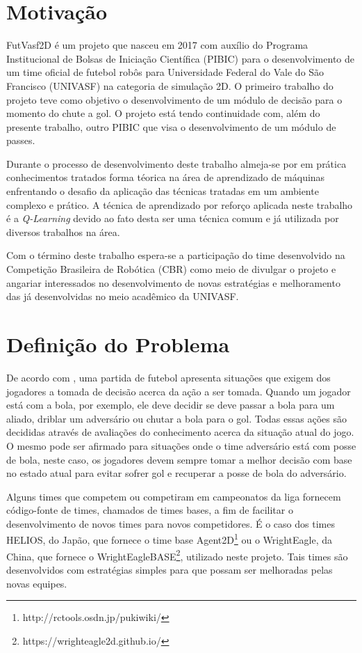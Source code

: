 \section{Motivação}

FutVasf2D é um projeto que nasceu em 2017 com auxílio do Programa Institucional de Bolsas de
Iniciação Científica (PIBIC) para o desenvolvimento de um time oficial de futebol robôs para
Universidade Federal do Vale do São Francisco (UNIVASF) na categoria de simulação 2D. O primeiro
trabalho do projeto teve como objetivo o desenvolvimento de um módulo de decisão para o momento do
chute a gol. O projeto está tendo continuidade com, além do presente trabalho, outro PIBIC que visa
o desenvolvimento de um módulo de passes.

Durante o processo de desenvolvimento deste trabalho almeja-se por em prática conhecimentos tratados
 forma téorica na área de aprendizado de máquinas enfrentando o desafio da aplicação das técnicas
 tratadas em um ambiente complexo e prático. A técnica de aprendizado por reforço aplicada neste
 trabalho é a \textit{Q-Learning} devido ao fato desta ser uma técnica comum e já utilizada por
 diversos trabalhos na área.

Com o término deste trabalho espera-se a participação do time desenvolvido na Competição
Brasileira de Robótica (CBR) como meio de divulgar o projeto e angariar interessados no
desenvolvimento de novas estratégias e melhoramento das já desenvolvidas no meio acadêmico da
UNIVASF.

\section{Definição do Problema}

De acordo com , uma partida de futebol apresenta situações que exigem
dos jogadores a tomada de decisão acerca da ação a ser tomada. Quando um jogador está com a bola,
por exemplo, ele deve decidir se deve passar a bola para um aliado, driblar um adversário ou chutar
a bola para o gol. Todas essas ações são decididas através de avaliações do conhecimento acerca da
situação atual do jogo. O mesmo pode ser afirmado para situações onde o time adversário está com
posse de bola, neste caso, os jogadores devem sempre tomar a melhor decisão com base no estado atual
para evitar sofrer gol e recuperar a posse de bola do adversário.

Alguns times que competem ou competiram em campeonatos da liga fornecem código-fonte de times,
chamados de times bases, a fim de facilitar o desenvolvimento de novos times para novos competidores. É
o caso dos times HELIOS, do Japão, que fornece o time base Agent2D\footnote{http://rctools.osdn.jp/pukiwiki/} ou o WrightEagle, da China,
que fornece o WrightEagleBASE\footnote{https://wrighteagle2d.github.io/}, utilizado neste projeto. Tais times são desenvolvidos com estratégias
simples para que possam ser melhoradas pelas novas equipes.

